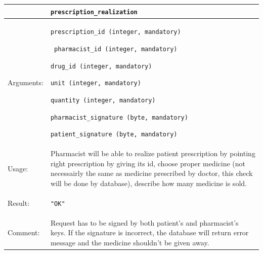     \begin{longtable}{| p{3cm} | p{10.75cm} |}
    \hline
     & \texttt{prescription\_realization} \\ \hline
    Arguments: &  \begin{packed_enum}
    	\item \texttt{prescription\_id (integer, mandatory)}
		\item\texttt{ pharmacist\_id (integer, mandatory)}
		\item \texttt{drug\_id (integer, mandatory)}
		\item \texttt{unit (integer, mandatory)}
		\item \texttt{quantity (integer, mandatory)}
		\item \texttt{pharmacist\_signature (byte, mandatory)}
		\item \texttt{patient\_signature (byte, mandatory)}

	\end{packed_enum}     \\ \hline
    Usage: & Pharmacist will be able to realize patient prescription by pointing right prescription by giving its id, choose proper medicine (not necessairly the same as medicine prescribed by doctor, this check will be done by database), describe how many medicine is sold.\\ \hline
    Result: & \begin{packed_enum}
    	\item \texttt{"OK"}
	\end{packed_enum}     \\ \hline	
	Comment: & Request has to be signed by both patient's and pharmacist's keys. If the signature is incorrect, the database will return error message and the medicine shouldn't be given away.\\ \hline
    \end{longtable}



